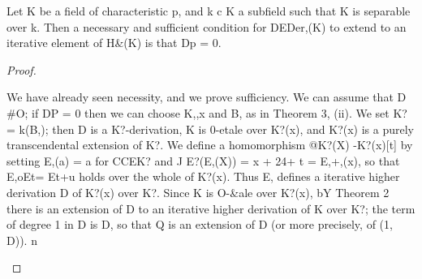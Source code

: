 \begin{theorem}[Theorem 27.4]\label{mcrt-auto-theorem-27-4}\uses{}
\begin{mathematicalrecord}
Let K be a field of characteristic p, and k c K a subfield
such that K is separable over k. Then a necessary and sufficient condition
for DEDer,(K)    to extend to an iterative element of H&(K) is that Dp = 0.
\end{mathematicalrecord}
\end{theorem}
\begin{proof}
\begin{mathematicalrecord}
We have already seen necessity, and we prove sufficiency. We can
assume that D #O; if DP = 0 then we can choose K,,x and B, as in
Theorem 3, (ii). We set K? = k(B,); then D is a K?-derivation,    K is 0-etale
over K?(x), and K?(x) is a purely transcendental extension of K?. We define
a homomorphism       @K?(X) -K?(x)[t]      by setting E,(a) = a for CCEK? and
J%
          E?(E,(X)) = x + 24+ t = E,+,(x),
so that E,oEt= Et+u holds over the whole of K?(x). Thus E, defines a
iterative higher derivation D of K?(x) over K?. Since K is O-&ale over K?(x),
bY Theorem 2 there is an extension of D to an iterative higher derivation of
K over K?; the term of degree 1 in D is D, so that Q is an extension of D (or
more precisely, of (1, D)). n
\end{mathematicalrecord}
\end{proof}
